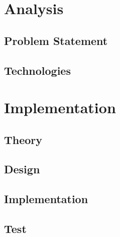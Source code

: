 




 
\tableofcontents



\part{Analysis}




\chapter{Problem Statement}



\chapter{Technologies}

%



\part{Implementation}

\chapter{Theory}

\chapter{Design}

\chapter{Implementation}


\chapter{Test}


